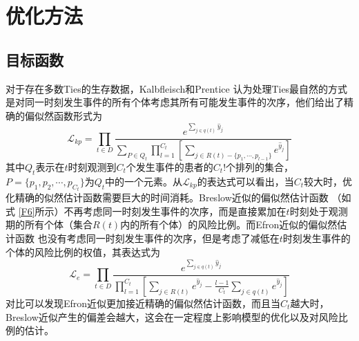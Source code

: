 \section{优化方法}

\subsection{目标函数}

对于存在多数Ties的生存数据，Kalbfleisch和Prentice  认为处理Ties最自然的方式是对同一时刻发生事件的所有个体考虑其所有可能发生事件的次序，他们给出了精确的偏似然函数形式为
\begin{equation}
\mathcal{L}_{kp} = \prod_{t\in D} \frac{e^{\sum_{j\in q(t)} \hat{y}_j}}{\sum_{P\in Q_t} \prod_{l=1}^{C_t} [\sum_{j \in R(t)-\{p_1,\cdots ,p_{l-1}\}} e^{\hat{y}_j}]}
\end{equation}
其中$Q_t$表示在$t$时刻观测到$C_t$个发生事件的患者的$C_t!$个排列的集合，$P=\{p_1,p_2,\cdots ,p_{C_t}\}$为$Q_t$中的一个元素。从$\mathcal{L}_{kp}$的表达式可以看出，当$C_t$较大时，优化精确的似然估计函数需要巨大的时间消耗。Breslow近似的偏似然估计函数 （如式 \eqref{F6}所示）不再考虑同一时刻发生事件的次序，而是直接累加在$t$时刻处于观测期的所有个体（集合$R(t)$内的所有个体）的风险比例。而Efron近似的偏似然估计函数 也没有考虑同一时刻发生事件的次序，但是考虑了减低在$t$时刻发生事件的个体的风险比例的权值，其表达式为
\begin{equation}
\mathcal{L}_{e} = \prod_{t\in D} \frac{e^{\sum_{j\in q(t)} \hat{y}_j}}{\prod_{l=1}^{C_t} \left[\sum_{j \in R(t)} e^{\hat{y}_j} - \frac{l-1}{C_t} \sum_{j \in q(t)} e^{\hat{y}_j} \right]}
\end{equation}
对比可以发现Efron近似更加接近精确的偏似然估计函数，而且当$C_t$越大时，Breslow近似产生的偏差会越大，这会在一定程度上影响模型的优化以及对风险比例的估计。

